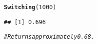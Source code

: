 \documentclass[12pt,letter]{article}\usepackage[]{graphicx}\usepackage[]{color}
\makeatletter
\newcommand{\hlnum}[1]{\textcolor[rgb]{0.686,0.059,0.569}{#1}}%
\newcommand{\hlcom}[1]{\textcolor[rgb]{0.678,0.584,0.686}{\textit{#1}}}%
\newcommand{\hlstd}[1]{\textcolor[rgb]{0.345,0.345,0.345}{#1}}%
\newcommand{\hlkwd}[1]{\textcolor[rgb]{0.737,0.353,0.396}{\textbf{#1}}}%
\newenvironment{kframe}{%
 \def\at@end@of@kframe{}%
 \ifinner\ifhmode%
  \def\at@end@of@kframe{\end{minipage}}%
  \begin{minipage}{\columnwidth}%
 \fi\fi%
 \def\FrameCommand##1{\hskip\@totalleftmargin \hskip-\fboxsep
 \colorbox{shadecolor}{##1}\hskip-\fboxsep
     \hskip-\linewidth \hskip-\@totalleftmargin \hskip\columnwidth}%
 \MakeFramed {\advance\hsize-\width
   \@totalleftmargin\z@ \linewidth\hsize
   \@setminipage}}%
 {\par\unskip\endMakeFramed%
 \at@end@of@kframe}
\newenvironment{knitrout}{}{} %
\makeatother
\begin{document}
\begin{knitrout}
\begin{kframe}
\begin{alltt}
\hlkwd{Switching}\hlstd{(}\hlnum{1000}\hlstd{)}
\end{alltt}
\begin{verbatim}
## [1] 0.696
\end{verbatim}
\begin{alltt}
\hlcom{# Returns approximately 0.68.}
\end{alltt}
\end{kframe}
\end{knitrout}
\end{document}
